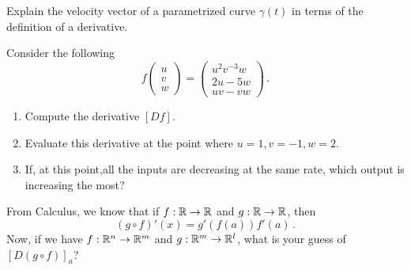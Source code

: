 \documentclass[12pt]{amsart}
\begin{document}
\begin{question}
    Explain the velocity vector of a parametrized curve $\gamma(t)$ in terms of the definition 
    of a derivative.
\end{question}

\begin{question}
    Consider the following 
    \begin{equation*}
        f
        \begin{pmatrix}
            u \\ v \\ w
        \end{pmatrix}
        =
        \begin{pmatrix}
            u^2 v^{-3} w \\ 2u - 5w \\ uv - vw
        \end{pmatrix} \,.
    \end{equation*}
    \begin{enumerate}
        \item Compute the derivative $[Df]$.
        \item Evaluate this derivative at the point where $u = 1, v = -1, w = 2$.
        \item If, at this point,all the inputs are decreasing at the same rate, which output is increasing the most?
    \end{enumerate}
\end{question}

\begin{question}
    From Calculus, we know that if $f:\mathbb{R} \to \mathbb{R}$ and $g: \mathbb{R} \to \mathbb{R}$, then
    \begin{equation*}
        (g\circ f)'(x) = g'(f(a)) f'(a) \,. 
    \end{equation*}
    Now, if we have $f: \mathbb{R}^n \to \mathbb{R}^m$ and $g: \mathbb{R}^m \to \mathbb{R}^l$, what is your guess of
    $[D (g\circ f)]_a$?
\end{question}
\end{document}

